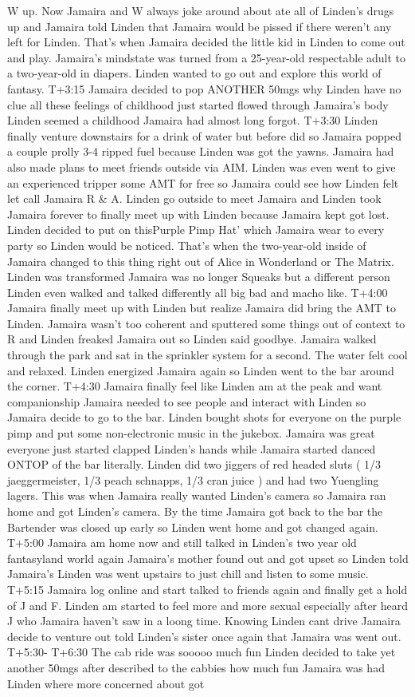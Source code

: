\documentclass[12pt]{book}
\begin{document}
W up. Now Jamaira and W always joke around about ate all of Linden's drugs up and Jamaira told Linden that Jamaira would be pissed if there weren't any left for Linden. That's when Jamaira decided the little kid in Linden to come out and play. Jamaira's mindstate was turned from a 25-year-old respectable adult to a two-year-old in diapers. Linden wanted to go out and explore this world of fantasy. T+3:15 Jamaira decided to pop ANOTHER 50mgs why Linden have no clue all these feelings of childhood just started flowed through Jamaira's body Linden seemed a childhood Jamaira had almost long forgot. T+3:30 Linden finally venture downstairs for a drink of water but before did so Jamaira popped a couple prolly 3-4 ripped fuel because Linden was got the yawns. Jamaira had also made plans to meet friends outside via AIM. Linden was even went to give an experienced tripper some AMT for free so Jamaira could see how Linden felt let call Jamaira R \& A. Linden go outside to meet Jamaira and Linden took Jamaira forever to finally meet up with Linden because Jamaira kept got lost. Linden decided to put on thisPurple Pimp Hat' which Jamaira wear to every party so Linden would be noticed. That's when the two-year-old inside of Jamaira changed to this thing right out of Alice in Wonderland or The Matrix. Linden was transformed Jamaira was no longer Squeaks but a different person Linden even walked and talked differently all big bad and macho like. T+4:00 Jamaira finally meet up with Linden but realize Jamaira did bring the AMT to Linden. Jamaira wasn't too coherent and sputtered some things out of context to R and Linden freaked Jamaira out so Linden said goodbye. Jamaira walked through the park and sat in the sprinkler system for a second. The water felt cool and relaxed. Linden energized Jamaira again so Linden went to the bar around the corner. T+4:30 Jamaira finally feel like Linden am at the peak and want companionship Jamaira needed to see people and interact with Linden so Jamaira decide to go to the bar. Linden bought shots for everyone on the purple pimp and put some non-electronic music in the jukebox. Jamaira was great everyone just started clapped Linden's hands while Jamaira started danced ONTOP of the bar literally. Linden did two jiggers of red headed sluts ( 1/3 jaeggermeister, 1/3 peach schnapps, 1/3 cran juice ) and had two Yuengling lagers. This was when Jamaira really wanted Linden's camera so Jamaira ran home and got Linden's camera. By the time Jamaira got back to the bar the Bartender was closed up early so Linden went home and got changed again. T+5:00 Jamaira am home now and still talked in Linden's two year old fantasyland world again Jamaira's mother found out and got upset so Linden told Jamaira's Linden was went upstairs to just chill and listen to some music. T+5:15 Jamaira log online and start talked to friends again and finally get a hold of J and F. Linden am started to feel more and more sexual especially after heard J who Jamaira haven't saw in a loong time. Knowing Linden cant drive Jamaira decide to venture out told Linden's sister once again that Jamaira was went out. T+5:30- T+6:30 The cab ride was sooooo much fun Linden decided to take yet another 50mgs after described to the cabbies how much fun Jamaira was had Linden where more concerned about got 
\end{document}

